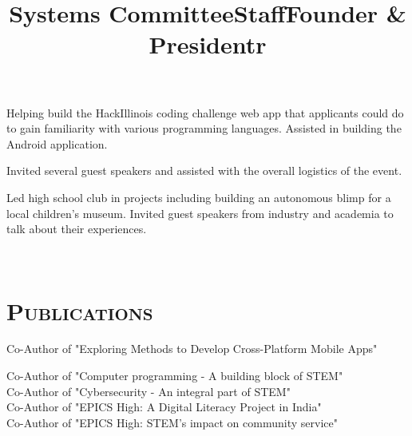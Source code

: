 \begin{resume}
\title{Systems Committee}
\begin{position}
Helping build the HackIllinois coding challenge web app that applicants could do to gain familiarity with various programming languages. Assisted in building the Android application.
\end{position}

\title{Staff}
\begin{position}
Invited several guest speakers and assisted with the overall logistics of the event.
\end{position}

\title{Founder \& President}
\begin{position}
Led high school club in projects including building an autonomous blimp for a local children's museum. Invited guest speakers from industry and academia to talk about their experiences.
\end{position}

\begin{formatb}
  \title{r}\\
\end{formatb}

\section{\textsc{Publications}}

\title{}
\begin{position}
Co-Author of "Exploring Methods to Develop Cross-Platform Mobile Apps"
\end{position}

\title{}
\begin{position}
Co-Author of "Computer programming - A building block of STEM" \\
Co-Author of "Cybersecurity - An integral part of STEM" \\
Co-Author of "EPICS High: A Digital Literacy Project in India" \\
Co-Author of "EPICS High: STEM's impact on community service"
\end{position}

\end{resume}

